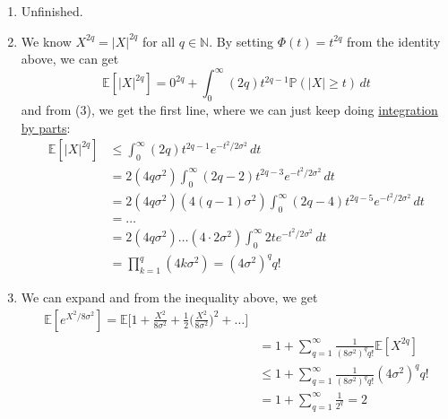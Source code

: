 \begin{solution}
\begin{enumerate}
      \item Unfinished. 
      
      \item We know $X^{2q} = |X|^{2q}$ for all $q \in \mathbb{N}$. By setting $\Phi(t) = t^{2q}$ from the identity above, we can get 
      \begin{equation}
        \mathbb{E}[|X|^{2q}] = 0^{2q} + \int_0^\infty (2q) t^{2q - 1} \mathbb{P}(|X| \geq t) \,dt
      \end{equation}
      and from (3), we get the first line, where we can just keep doing \hyperref[real-thm:integration-by-parts]{integration by parts}: 
      \begin{align*}
          \mathbb{E}[|X|^{2q}] & \leq \int_0^\infty (2q) t^{2q - 1} e^{- t^2 / 2 \sigma^2} \,dt \\
          & = 2 (4q \sigma^2) \int_0^\infty (2q - 2) t^{2q - 3} e^{-t^2 / 2 \sigma^2} \, dt \\
          & = 2 (4q \sigma^2) (4 (q - 1) \sigma^2) \int_0^\infty (2q - 4) t^{2q - 5} e^{-t^2 / 2\sigma^2} \,dt \\
          & = \ldots \\
          & = 2 (4q \sigma^2) \ldots (4 \cdot 2\sigma^2) \int_0^\infty 2t e^{-t^2 / 2 \sigma^2} \,dt \\
          & = \prod_{k=1}^q (4 k \sigma^2) = (4 \sigma^2)^q q! 
      \end{align*}
      
      \item We can expand and from the inequality above, we get 
      \begin{align*}
          \mathbb{E}[e^{X^2 / 8 \sigma^2}] = \mathbb{E} \bigg[ 1 + \frac{X^2}{8 \sigma^2} + \frac{1}{2} \bigg( \frac{X^2}{8 \sigma^2}\bigg)^2 + \ldots \bigg] \\
          & = 1 + \sum_{q = 1}^\infty \frac{1}{(8 \sigma^2)^q q!} \mathbb{E}[X^{2q}] \\
          & \leq 1 + \sum_{q = 1}^\infty \frac{1}{(8 \sigma^2)^q q!} (4 \sigma^2)^q q! \\
          & = 1 + \sum_{q=1}^\infty \frac{1}{2^q} = 2 
      \end{align*}
  \end{enumerate}


  \end{solution}

